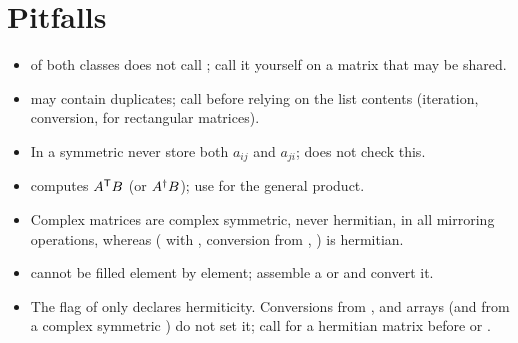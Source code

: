 \section{Pitfalls}\label{sec:sparse:pitfalls}
\begin{itemize}
\item {} of both classes does not call ; call it yourself on a matrix that may be shared.
\item {} may contain duplicates; call  before relying on the list contents
  (iteration,  conversion,  for rectangular matrices).
\item In a symmetric  never store both $a_{ij}$ and $a_{ji}$;  does not check this.
\item {} computes $A^{\mathsf T} B$ (or $A^{\dagger} B$); use  for the general product.
\item Complex  matrices are complex symmetric, never hermitian, in all mirroring operations, whereas  ( with , conversion from , ) is hermitian.
\item {} cannot be filled element by element; assemble a  or  and convert it.
\item The flag of  only declares hermiticity. Conversions from ,  and arrays (and from a complex
  symmetric ) do not set it; call  for a hermitian matrix before  or .
\end{itemize}
